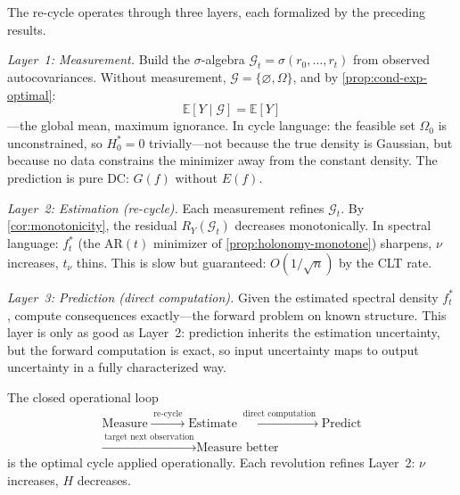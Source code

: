 \begin{remark}\label{rem:three-layers}
The re-cycle operates through three layers, each formalized by the preceding results.

\emph{Layer~1: Measurement.}
Build the $\sigma$-algebra $\mathcal{G}_t = \sigma(r_0, \ldots, r_t)$ from observed autocovariances. Without measurement, $\mathcal{G} = \{\varnothing, \Omega\}$, and by \cref{prop:cond-exp-optimal}:
\[
\mathbb{E}[Y \mid \mathcal{G}] = \mathbb{E}[Y]
\]
---the global mean, maximum ignorance. In cycle language: the feasible set $\Omega_0$ is unconstrained, so $H_0^* = 0$ trivially---not because the true density is Gaussian, but because no data constrains the minimizer away from the constant density. The prediction is pure DC: $G(f)$ without $E(f)$.

\emph{Layer~2: Estimation (re-cycle).}
Each measurement refines $\mathcal{G}_t$. By \cref{cor:monotonicity}, the residual $R_Y(\mathcal{G}_t)$ decreases monotonically. In spectral language: $f_t^*$ (the AR$(t)$ minimizer of \cref{prop:holonomy-monotone}) sharpens, $\nu$ increases, $t_\nu$ thins. This is slow but guaranteed: $O(1/\sqrt{n})$ by the CLT rate.

\emph{Layer~3: Prediction (direct computation).}
Given the estimated spectral density $f_t^*$, compute consequences exactly---the forward problem on known structure. This layer is only as good as Layer~2: prediction inherits the estimation uncertainty, but the forward computation is exact, so input uncertainty maps to output uncertainty in a fully characterized way.

The closed operational loop
\begin{gather*}
\text{Measure}
\xrightarrow{\;\text{re-cycle}\;}
\text{Estimate}
\xrightarrow{\;\text{direct computation}\;}
\text{Predict} \\
\xrightarrow{\;\text{target next observation}\;}
\text{Measure better}
\end{gather*}
is the optimal cycle applied operationally. Each revolution refines Layer~2: $\nu$ increases, $H$ decreases.
\end{remark}

